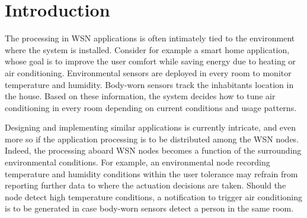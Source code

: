 \section{Introduction}
The processing in WSN applications is often intimately tied to the
environment where the system is installed. Consider for example a
smart home application, whose goal is to improve the user comfort
while saving energy due to heating or air conditioning. Environmental
sensors are deployed in every room to monitor temperature and
humidity. Body-worn sensors track the inhabitants location in the
house. Based on these information, the system decides how to tune air
conditioning in every room depending on current conditions and usage
patterns.
 
Designing and implementing similar applications is currently
intricate, and even more so if the application processing is to be
distributed among the WSN nodes. Indeed, the processing aboard WSN
nodes becomes a function of the surrounding environmental
conditions. For example, an environmental node recording temperature
and humidity conditions within the user tolerance may refrain from
reporting further data to where the actuation decisions are
taken. Should the node detect high temperature conditions, a
notification to trigger air conditioning is to be generated in case
body-worn sensors detect a person in the same
room. %


